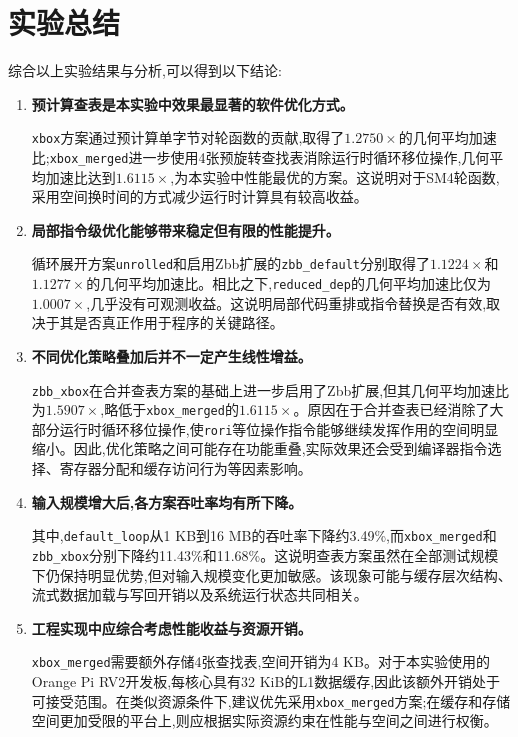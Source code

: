 \section{实验总结}

综合以上实验结果与分析,可以得到以下结论:

\begin{enumerate}
    \item \textbf{预计算查表是本实验中效果最显著的软件优化方式。}
    
    \texttt{xbox}方案通过预计算单字节对轮函数的贡献,取得了$1.2750\times$的几何平均加速比;\texttt{xbox\_merged}进一步使用4张预旋转查找表消除运行时循环移位操作,几何平均加速比达到$1.6115\times$,为本实验中性能最优的方案。这说明对于SM4轮函数,采用空间换时间的方式减少运行时计算具有较高收益。

    \item \textbf{局部指令级优化能够带来稳定但有限的性能提升。}
    
    循环展开方案\texttt{unrolled}和启用Zbb扩展的\texttt{zbb\_default}分别取得了$1.1224\times$和$1.1277\times$的几何平均加速比。相比之下,\texttt{reduced\_dep}的几何平均加速比仅为$1.0007\times$,几乎没有可观测收益。这说明局部代码重排或指令替换是否有效,取决于其是否真正作用于程序的关键路径。

    \item \textbf{不同优化策略叠加后并不一定产生线性增益。}
    
    \texttt{zbb\_xbox}在合并查表方案的基础上进一步启用了Zbb扩展,但其几何平均加速比为$1.5907\times$,略低于\texttt{xbox\_merged}的$1.6115\times$。原因在于合并查表已经消除了大部分运行时循环移位操作,使\texttt{rori}等位操作指令能够继续发挥作用的空间明显缩小。因此,优化策略之间可能存在功能重叠,实际效果还会受到编译器指令选择、寄存器分配和缓存访问行为等因素影响。

    \item \textbf{输入规模增大后,各方案吞吐率均有所下降。}
    
    其中,\texttt{default\_loop}从1 KB到16 MB的吞吐率下降约3.49\%,而\texttt{xbox\_merged}和\texttt{zbb\_xbox}分别下降约11.43\%和11.68\%。这说明查表方案虽然在全部测试规模下仍保持明显优势,但对输入规模变化更加敏感。该现象可能与缓存层次结构、流式数据加载与写回开销以及系统运行状态共同相关。

    \item \textbf{工程实现中应综合考虑性能收益与资源开销。}
    
    \texttt{xbox\_merged}需要额外存储4张查找表,空间开销为4 KB。对于本实验使用的Orange Pi RV2开发板,每核心具有32 KiB的L1数据缓存,因此该额外开销处于可接受范围。在类似资源条件下,建议优先采用\texttt{xbox\_merged}方案;在缓存和存储空间更加受限的平台上,则应根据实际资源约束在性能与空间之间进行权衡。
\end{enumerate}
